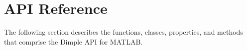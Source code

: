 \section{API Reference}

The following section describes the functions, classes, properties, and methods that comprise the Dimple API for MATLAB.










